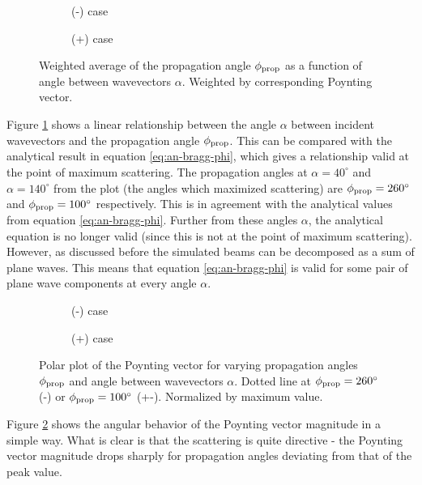 \documentclass[11pt,twoside]{eitExjobb}
\begin{document}
	\begin{figure}[H]
		\centering
		\begin{subfigure}{\textwidth}
			\resizebox{\textwidth}{!}{
				
			}
			\caption{(-) case}
		\end{subfigure}
		\begin{subfigure}{\textwidth}
			\resizebox{\textwidth}{!}{
				
			}
			\caption{(+) case}
		\end{subfigure}
		\caption{\label{fig:res-angle-sweep-angles} Weighted average of the propagation angle $\phi_{\mathrm{prop}}$ as a function of angle between wavevectors $\alpha$. Weighted by corresponding Poynting vector.}
	\end{figure}
	Figure \ref{fig:res-angle-sweep-angles} shows a linear relationship between the angle $\alpha$ between incident wavevectors and the propagation angle $\phi_{\mathrm{prop}}$. This can be compared with the analytical result in equation \eqref{eq:an-bragg-phi}, which gives a relationship valid at the point of maximum scattering. The propagation angles at $\alpha = 40^\circ$ and $\alpha = 140^\circ$ from the plot (the angles which maximized scattering) are $\phi_{\mathrm{prop}} = 260^\circ$ and $\phi_{\mathrm{prop}} = 100^\circ$ respectively. This is in agreement with the analytical values from equation \eqref{eq:an-bragg-phi}. Further from these angles $\alpha$, the analytical equation is no longer valid (since this is not at the point of maximum scattering). However, as discussed before the simulated beams can be decomposed as a sum of plane waves. This means that equation \eqref{eq:an-bragg-phi} is valid for some pair of plane wave components at every angle $\alpha$.
	
	\begin{figure}[H]
		\centering
		\begin{subfigure}{\textwidth}
			\resizebox{\textwidth}{!}{
				
			}
			\caption{(-) case}
		\end{subfigure}
		\begin{subfigure}{\textwidth}
			\resizebox{\textwidth}{!}{
				
			}
			\caption{(+) case}
		\end{subfigure}
		\caption{\label{fig:res-angle-sweep-polar} Polar plot of the Poynting vector for varying propagation angles $\phi_{\mathrm{prop}}$ and angle between wavevectors $\alpha$. Dotted line at $\phi_{\mathrm{prop}} = 260^\circ$ (-) or $\phi_{\mathrm{prop}} = 100^\circ$ (+-). Normalized by maximum value.}
	\end{figure}
	Figure \ref{fig:res-angle-sweep-polar} shows the angular behavior of the Poynting vector magnitude in a simple way. What is clear is that the scattering is quite directive - the Poynting vector magnitude drops sharply for propagation angles deviating from that of the peak value.
	
\end{document}

